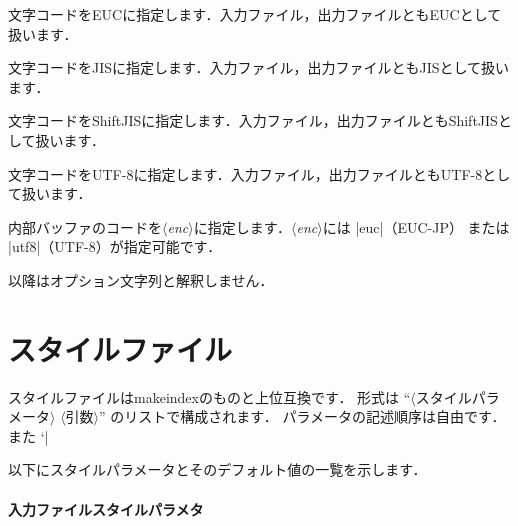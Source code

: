 \documentclass[a4paper]{jsarticle}
\newcommand{\SoftName}[1]{\textsf{#1}}
\newcommand{\Meta}[1]{$\langle$\mbox{}\textit{#1}\mbox{}$\rangle$}
\newcommand{\jMeta}[1]{$\langle$\mbox{}\textsf{#1}\mbox{}$\rangle$}
\begin{document}
\begin{description}[leftmargin=2cm]
\item[|-E|]
文字コードをEUCに指定します．入力ファイル，出力ファイルともEUCとして扱います．

\item[|-J|]
文字コードをJISに指定します．入力ファイル，出力ファイルともJISとして扱います．

\item[|-S|]
文字コードをShiftJISに指定します．入力ファイル，出力ファイルともShiftJISとして扱います．

\item[|-U|]
文字コードをUTF-8に指定します．入力ファイル，出力ファイルともUTF-8として扱います．

\item[|-I| \Meta{enc}]
内部バッファのコードを\Meta{enc}に指定します．\Meta{enc}には |euc|（EUC-JP）
または |utf8|（UTF-8）が指定可能です．

\item[|--|]
以降はオプション文字列と解釈しません． %
\end{description}

\section{スタイルファイル}

スタイルファイルは\SoftName{makeindex}のものと上位互換です．
形式は ``\jMeta{スタイルパラメータ} \jMeta{引数}'' のリストで構成されます．
パラメータの記述順序は自由です．また `|%

以下にスタイルパラメータとそのデフォルト値の一覧を示します．

\paragraph{入力ファイルスタイルパラメタ}
\end{document}

